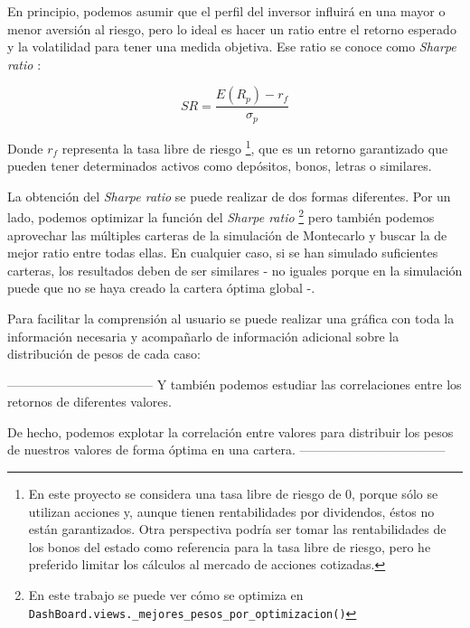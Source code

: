 En principio, podemos asumir que el perfil del inversor influirá en una mayor o menor aversión al riesgo, pero lo ideal es hacer un ratio entre el retorno esperado y la volatilidad para tener una medida objetiva. Ese ratio se conoce como \emph{Sharpe ratio} \citep{wiki:sharpe_ratio}:

\begin{equation}
	SR = \frac{E(R_{p}) - r_{f}}{\sigma_{p}}
\end{equation}

Donde $r_{f}$ representa la tasa libre de riesgo \footnote{En este proyecto se considera una tasa libre de riesgo de 0, porque sólo se utilizan acciones y, aunque tienen rentabilidades por dividendos, éstos no están garantizados. Otra perspectiva podría ser tomar las rentabilidades de los bonos del estado como referencia para la tasa libre de riesgo, pero he preferido limitar los cálculos al mercado de acciones cotizadas.}, que es un retorno garantizado que pueden tener determinados activos como depósitos, bonos, letras o similares. 

La obtención del \emph{Sharpe ratio} se puede realizar de dos formas diferentes. Por un lado, podemos optimizar la función del \emph{Sharpe ratio} \footnote{En este trabajo se puede ver cómo se optimiza en \texttt{DashBoard.views.\_mejores\_pesos\_por\_optimizacion()}} pero también podemos aprovechar las múltiples carteras de la simulación de Montecarlo y buscar la de mejor ratio entre todas ellas. En cualquier caso, si se han simulado suficientes carteras, los resultados deben de ser similares - no iguales porque en la simulación puede que no se haya creado la cartera óptima global -. 

Para facilitar la comprensión al usuario se puede realizar una gráfica con toda la información necesaria y acompañarlo de información adicional sobre la distribución de pesos de cada caso:






-----------------------------------
Y también podemos estudiar las correlaciones entre los retornos de diferentes valores. 

De hecho, podemos explotar la correlación entre valores para distribuir los pesos de nuestros valores de forma óptima en una cartera. 
-----------------------------------

